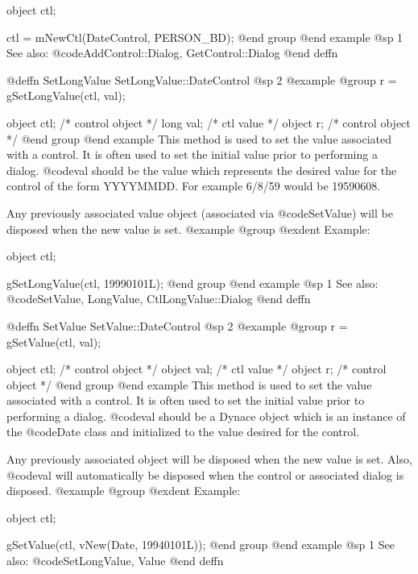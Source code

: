 object  ctl;

ctl = mNewCtl(DateControl, PERSON_BD);
@end group
@end example
@sp 1
See also:  @code{AddControl::Dialog, GetControl::Dialog}
@end deffn










@deffn {SetLongValue} SetLongValue::DateControl
@sp 2
@example
@group
r = gSetLongValue(ctl, val);

object  ctl;    /*  control object  */
long    val;    /*  ctl value       */
object  r;      /*  control object  */
@end group
@end example
This method is used to set the value associated with a control.  It is
often used to set the initial value prior to performing a dialog.
@code{val} should be the value which represents the desired value for
the control of the form YYYYMMDD.  For example 6/8/59 would be
19590608.

Any previously associated value object (associated via @code{SetValue})
will be disposed when the new value is set.
@example
@group
@exdent Example:

object  ctl;

gSetLongValue(ctl, 19990101L);
@end group
@end example
@sp 1
See also:  @code{SetValue, LongValue, CtlLongValue::Dialog}
@end deffn













@deffn {SetValue} SetValue::DateControl
@sp 2
@example
@group
r = gSetValue(ctl, val);

object  ctl;    /*  control object  */
object  val;    /*  ctl value       */
object  r;      /*  control object  */
@end group
@end example
This method is used to set the value associated with a control.  It is
often used to set the initial value prior to performing a dialog.
@code{val} should be a Dynace object which is an instance of the
@code{Date} class and initialized to the value desired for the control.

Any previously associated object will be disposed when the new value is set.
Also, @code{val} will automatically be disposed when the control or associated
dialog is disposed.
@example
@group
@exdent Example:

object  ctl;

gSetValue(ctl, vNew(Date, 19940101L));
@end group
@end example
@sp 1
See also:  @code{SetLongValue, Value}
@end deffn














